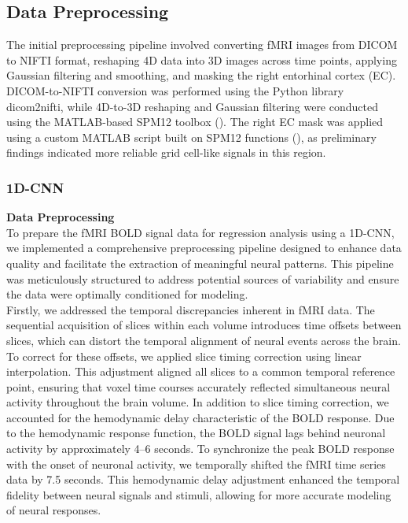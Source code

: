 \documentclass[a4paper]{article}
\begin{document}
\subsection{Data Preprocessing}
The initial preprocessing pipeline involved converting fMRI images from DICOM to NIFTI format, reshaping 4D data into 3D images across time points, applying Gaussian filtering and smoothing, and masking the right entorhinal cortex (EC). DICOM-to-NIFTI conversion was performed using the Python library dicom2nifti, while 4D-to-3D reshaping and Gaussian filtering were conducted using the MATLAB-based SPM12 toolbox (\cite{noauthor_spm12_nodate}). The right EC mask was applied using a custom MATLAB script built on SPM12 functions (\cite{noauthor_simurgh818bmed8803_dl_project_nodate}), as preliminary findings indicated more reliable grid cell-like signals in this region.

\subsubsection{\textbf{1D-CNN}}
\textbf{Data Preprocessing}\\
To prepare the fMRI BOLD signal data for regression analysis using a 1D-CNN, we implemented a comprehensive preprocessing pipeline designed to enhance data quality and facilitate the extraction of meaningful neural patterns. This pipeline was meticulously structured to address potential sources of variability and ensure the data were optimally conditioned for modeling.\\

\noindent Firstly, we addressed the temporal discrepancies inherent in fMRI data. The sequential acquisition of slices within each volume introduces time offsets between slices, which can distort the temporal alignment of neural events across the brain. To correct for these offsets, we applied slice timing correction using linear interpolation. This adjustment aligned all slices to a common temporal reference point, ensuring that voxel time courses accurately reflected simultaneous neural activity throughout the brain volume. In addition to slice timing correction, we accounted for the hemodynamic delay characteristic of the BOLD response. Due to the hemodynamic response function, the BOLD signal lags behind neuronal activity by approximately 4–6 seconds. To synchronize the peak BOLD response with the onset of neuronal activity, we temporally shifted the fMRI time series data by 7.5 seconds. This hemodynamic delay adjustment enhanced the temporal fidelity between neural signals and stimuli, allowing for more accurate modeling of neural responses.\\
\end{document}
